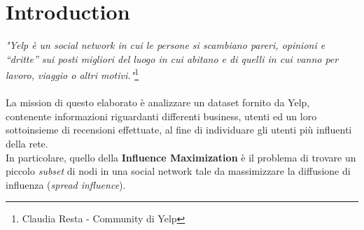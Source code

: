 
\chapter{Introduction}
\textit{"Yelp è un social network in cui le persone si scambiano pareri, opinioni e “dritte” sui posti migliori del luogo in cui abitano e di quelli in cui vanno per lavoro, viaggio o altri motivi."}\footnote{Claudia Resta - Community di Yelp}\\\\
La mission di questo elaborato è analizzare un dataset fornito da Yelp, contenente informazioni riguardanti differenti business, utenti ed un loro sottoinsieme di recensioni effettuate, al fine di individuare gli utenti più influenti della rete.\\
In particolare, quello della \textbf{Influence Maximization} è il problema di trovare un piccolo \textit{subset} di nodi in una social network tale da  massimizzare la diffusione di influenza (\textit{spread influence}).
